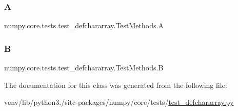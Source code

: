 \subsubsection{\texorpdfstring{A}{A}}
{\footnotesize\ttfamily numpy.\+core.\+tests.\+test\+\_\+defchararray.\+Test\+Methods.\+A}

\mbox{\label{classnumpy_1_1core_1_1tests_1_1test__defchararray_1_1TestMethods_a5089ef66178a3f7c5fd3b6282e18bca9}} 
\subsubsection{\texorpdfstring{B}{B}}
{\footnotesize\ttfamily numpy.\+core.\+tests.\+test\+\_\+defchararray.\+Test\+Methods.\+B}



The documentation for this class was generated from the following file\+:\begin{DoxyCompactItemize}
\item 
venv/lib/python3./site-\/packages/numpy/core/tests/\hyperlink{test__defchararray_8py}{test\+\_\+defchararray.\+py}\end{DoxyCompactItemize}
